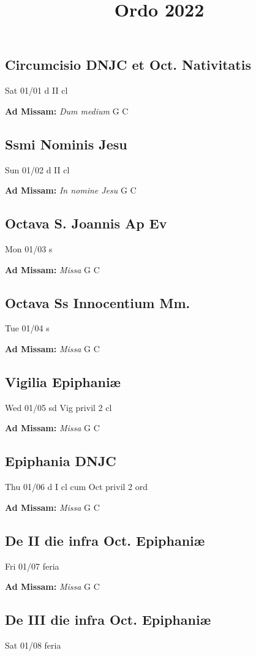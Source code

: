 \documentclass[letterpaper, 10pt, twocolumn]{article}
\title{Ordo 2022}
\begin{document}
\subsection*{Circumcisio DNJC et Oct. Nativitatis}Sat 01/01 d II cl

\textbf{Ad Missam:} \textit{Dum medium} G C 

\subsection*{Ssmi Nominis Jesu}Sun 01/02 d II cl

\textbf{Ad Missam:} \textit{In nomine Jesu} G C 

\subsection*{Octava S. Joannis Ap Ev}Mon 01/03 s

\textbf{Ad Missam:} \textit{Missa} G C 

\subsection*{Octava Ss Innocentium Mm.}Tue 01/04 s

\textbf{Ad Missam:} \textit{Missa} G C 

\subsection*{Vigilia Epiphaniæ}Wed 01/05 sd Vig privil 2 cl

\textbf{Ad Missam:} \textit{Missa} G C 

\subsection*{Epiphania DNJC}Thu 01/06 d I cl cum Oct privil 2 ord

\textbf{Ad Missam:} \textit{Missa} G C 

\subsection*{De II die infra Oct. Epiphaniæ}Fri 01/07 feria

\textbf{Ad Missam:} \textit{Missa} G C 

\subsection*{De III die infra Oct. Epiphaniæ}Sat 01/08 feria
\end{document}
